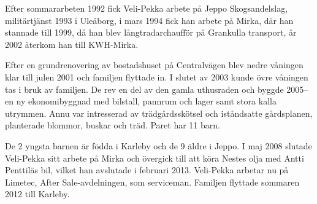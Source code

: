 Efter sommararbeten 1992 fick Veli-Pekka arbete på Jeppo Skogsandelslag, militärtjänst 1993 i Uleåborg, i mars 1994 fick han arbete på Mirka, där han stannade till 1999, då han blev långtradarchaufför på Grankulla transport, år 2002 återkom han till KWH-Mirka.

Efter en grundrenovering av bostadshuset på Centralvägen	blev nedre våningen klar till julen 2001 och familjen flyttade in. I slutet av 2003 kunde övre våningen tas i bruk av familjen.  De rev en del av den gamla uthusraden och byggde 2005-- en ny ekonomibyggnad med 	bilstall, pannrum och lager samt stora kalla utrymmen. Annu var intresserad av trädgårdsskötsel och iståndsatte gårdsplanen, planterade	blommor, buskar och träd. Paret har 11 barn.
\begin{jhchildren}
  \item {}
  \item {}
  \item {}
  \item {}
  \item {}
  \item {}
  \item {}
  \item {}
  \item {}
  \item {}
  \item {}
\end{jhchildren}
De 2 yngsta barnen är födda i Karleby och de 9 äldre i Jeppo. I maj 2008 slutade Veli-Pekka sitt arbete på Mirka och övergick till att köra Nestes olja med Antti Penttiläs bil, vilket han avslutade i februari 2013. Veli-Pekka arbetar nu på Limetec, After Sale-avdelningen, som serviceman. Familjen flyttade sommaren 2012 till Karleby.


%
\jhvspace{}



